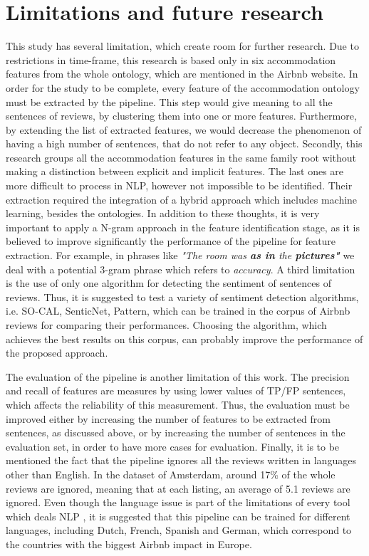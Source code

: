 \section{Limitations and future research}
This study has several limitation, which create room for further research. Due to restrictions in time-frame, this research is based only in six accommodation features from the whole ontology, which are mentioned in the Airbnb website. In order for the study to be complete, every feature of the accommodation ontology must be extracted by the pipeline. This step would give meaning to all the sentences of reviews, by clustering them into one or more features. Furthermore, by extending the list of extracted features, we would decrease the phenomenon of having a high number of sentences, that do not refer to any object. Secondly, this research groups all the accommodation features in the same family root without making a distinction between explicit and implicit features. The last ones are more difficult to process in NLP, however not impossible to be identified. Their extraction required the integration of a hybrid approach which includes machine learning, besides the ontologies. In addition to these thoughts, it is very important to apply a N-gram approach in the feature identification stage, as it is believed to improve significantly the performance of the pipeline for feature extraction. For example, in phrases like \textit{"The room was \textbf{as in} the \textbf{pictures"}} we deal with a potential 3-gram phrase which refers to \textit{accuracy}. A third limitation is the use of only one algorithm for detecting the sentiment of sentences of reviews. Thus, it is suggested to test a variety of sentiment detection algorithms, i.e. SO-CAL, SenticNet, Pattern, which can be trained in the corpus of Airbnb reviews for comparing their performances. Choosing the algorithm, which achieves the best results on this corpus, can probably improve the performance of the proposed approach.

The evaluation of the pipeline is another limitation of this work. The precision and recall of features are measures by using lower values of TP/FP sentences, which affects the reliability of this measurement. Thus, the evaluation must be improved either by increasing the number of features to be extracted from sentences, as discussed above, or by increasing the number of sentences in the evaluation set, in order to have more cases for evaluation. Finally, it is to be mentioned the fact that the pipeline ignores all the reviews written in languages other than English. In the dataset of Amsterdam, around 17\% of the whole reviews are ignored, meaning that at each listing, an average of 5.1 reviews are ignored. Even though the language issue is part of the limitations of every tool which deals NLP \cite{ravi2015survey}, it is suggested that this pipeline can be trained for different languages, including Dutch, French, Spanish and German, which correspond to the countries with the biggest Airbnb impact in Europe. 

